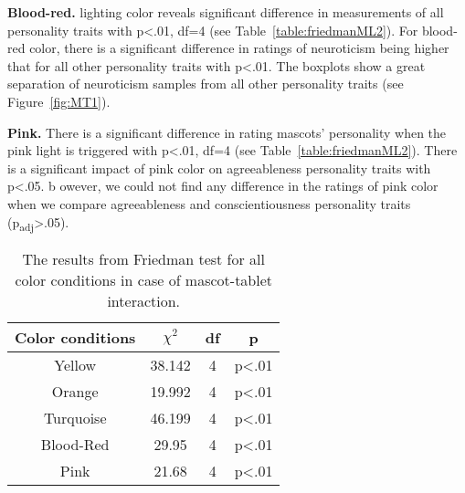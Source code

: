 \par\textbf{Blood-red.}
lighting color reveals significant difference in measurements of all personality traits
with p<.01, df=4 (see Table~\ref{table:friedmanML2}).
For blood-red color, there is a significant difference in ratings of neuroticism
being higher that for all other personality traits with p<.01.
The boxplots show a great separation of neuroticism samples from all
other personality traits (see Figure~\ref{fig:MT1}).


\par\textbf{Pink.}
There is a significant difference in rating mascots' personality when the pink light is
triggered with p<.01, df=4 (see Table~\ref{table:friedmanML2}).
There is a significant impact of pink color on agreeableness personality traits with p<.05.
b owever, we could not find any difference in the ratings of pink color when
we compare agreeableness and conscientiousness personality traits (p\textsubscript{adj}>.05).


\begin{table}[!htb]
    \renewcommand{\arraystretch}{1}
    \begin{center}
        \begin{tabular}{|c|c|c|c|}
            \hline
            \textbf{Color conditions} & \textbf{$\chi^2$} & \textbf{df} & \textbf{p} \\
            \hline
            Yellow &38.142 &4 &p<.01 \\
            \hline
            Orange &19.992 &4 &p<.01 \\
            \hline
            Turquoise &46.199 &4 &p<.01 \\
            \hline
            Blood-Red &29.95 &4 &p<.01 \\
            \hline
            Pink &21.68 &4 &p<.01 \\
            \hline
        \end{tabular}
        \caption{The results from Friedman test for all color conditions in case of mascot-tablet interaction.}
        \label{table:friedmanMT2}
    \end{center}
\end{table}

